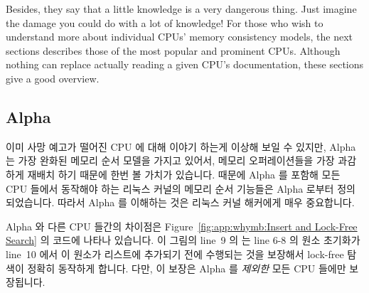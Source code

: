 Besides, they say that a little knowledge is a very dangerous thing.
Just imagine the damage you could do with a lot of knowledge!
For those who wish to understand more about individual CPUs'
memory consistency models, the next sections describes those of the
most popular and prominent CPUs.
Although nothing can replace actually reading a given CPU's documentation,
these sections give a good overview.
\fi

\subsection{Alpha}

이미 사망 예고가 떨어진 CPU 에 대해 이야기 하는게 이상해 보일 수 있지만, Alpha
는 가장 완화된 메모리 순서 모델을 가지고 있어서, 메모리 오퍼레이션들을 가장
과감하게 재배치 하기 때문에 한번 볼 가치가 있습니다.
때문에 Alpha 를 포함해 모든 CPU 들에서 동작해야 하는 리눅스 커널의 메모리 순서
기능들은 Alpha 로부터 정의되었습니다.
따라서 Alpha 를 이해하는 것은 리눅스 커널 해커에게 매우 중요합니다.

Alpha 와 다른 CPU 들간의 차이점은
Figure~\ref{fig:app:whymb:Insert and Lock-Free Search} 의 코드에 나타나
있습니다.
이 그림의 line~9 의  는 line 6-8 의 원소 초기화가 line~10 에서
이 원소가 리스트에 추가되기 전에 수행되는 것을 보장해서 lock-free 탐색이 정확히
동작하게 합니다.
다만, 이 보장은 Alpha 를 {\em 제외한} 모든 CPU 들에만 보장됩니다.

